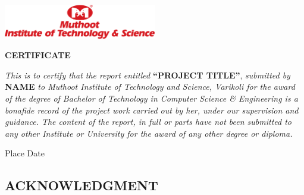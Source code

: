 \documentclass[a4paper,12pt,oneside]{report}  %
\begin{document}
\begin{titlepage}
\vspace{1.5cm}
\begin{center}
   \includegraphics[width=0.50\textwidth]{MITS.png}\par\vspace{1cm}
   {\scshape \Large \bfseries CERTIFICATE \par}
\end{center}
\newline \noindent
\textit{This is to certify that the report entitled} \textbf{“PROJECT TITLE”}, \textit{submitted by} \textbf{NAME  } \textit{to Muthoot Institute of Technology and Science, Varikoli for the award of the degree of Bachelor of Technology in Computer Science \&  Engineering is a bonafide record of the project work carried out by her, under our supervision and guidance. The content of the report, in full or parts have not been submitted to any other Institute or University for the award of any other degree or diploma.}
\vspace{2.5cm}
\newline \noindent
{}
\newline
{}

\vspace{3cm}

{\noindent Place \newline \noindent Date}

\vspace{3cm}
\newline \noindent


\end{titlepage}



\newpage
{}
\setcounter{page}{1}
\thispagestyle{plain}
\begin{center}

\section*{ACKNOWLEDGMENT}
\end{center}
\end{document}
